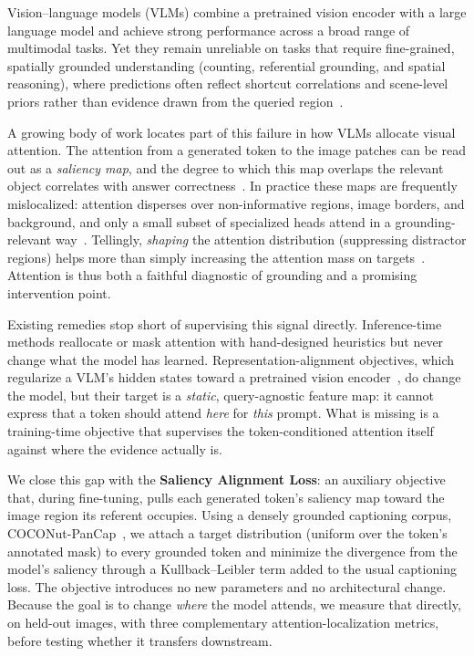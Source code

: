 Vision--language models (VLMs) combine a pretrained vision encoder with a large language model and achieve strong performance across a broad range of multimodal tasks. Yet they remain unreliable on tasks that require fine-grained, spatially grounded understanding (counting, referential grounding, and spatial reasoning), where predictions often reflect shortcut correlations and scene-level priors rather than evidence drawn from the queried region~\citep{chenspatial, sengupta2025can}.

A growing body of work locates part of this failure in how VLMs allocate visual attention. The attention from a generated token to the image patches can be read out as a \emph{saliency map}, and the degree to which this map overlaps the relevant object correlates with answer correctness~\citep{chenspatial}. In practice these maps are frequently mislocalized: attention disperses over non-informative regions, image borders, and background, and only a small subset of specialized heads attend in a grounding-relevant way~\citep{kangsee, kang2025your, kim2025interpreting}. Tellingly, \emph{shaping} the attention distribution (suppressing distractor regions) helps more than simply increasing the attention mass on targets~\citep{sengupta2025can}. Attention is thus both a faithful diagnostic of grounding and a promising intervention point.

Existing remedies stop short of supervising this signal directly. Inference-time methods reallocate or mask attention with hand-designed heuristics but never change what the model has learned. Representation-alignment objectives, which regularize a VLM's hidden states toward a pretrained vision encoder~\citep{yurepresentation, yoon2025visual}, do change the model, but their target is a \emph{static}, query-agnostic feature map: it cannot express that a token should attend \emph{here} for \emph{this} prompt. What is missing is a training-time objective that supervises the token-conditioned attention itself against where the evidence actually is.

We close this gap with the \textbf{Saliency Alignment Loss}: an auxiliary objective that, during fine-tuning, pulls each generated token's saliency map toward the image region its referent occupies. Using a densely grounded captioning corpus, COCONut-PanCap~\citep{deng2025coconut}, we attach a target distribution (uniform over the token's annotated mask) to every grounded token and minimize the divergence from the model's saliency through a Kullback--Leibler term added to the usual captioning loss. The objective introduces no new parameters and no architectural change. Because the goal is to change \emph{where} the model attends, we measure that directly, on held-out images, with three complementary attention-localization metrics, before testing whether it transfers downstream.

